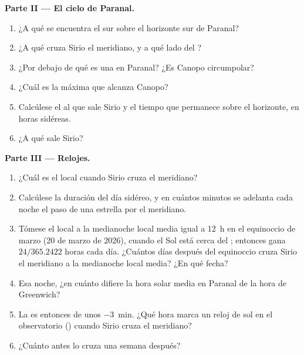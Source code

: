 \begin{problem}
\medskip
\noindent\textbf{Parte II --- El cielo de Paranal.}
\begin{enumerate}[resume]
  \item ¿A qué  se encuentra el  sur sobre el horizonte sur de
        Paranal?
  \item ¿A qué  cruza Sirio el meridiano, y a qué lado del ?
  \item ¿Por debajo de qué  es una  en Paranal?
        ¿Es Canopo circumpolar?
  \item ¿Cuál es la  máxima que alcanza Canopo?
  \item Calcúlese el  al que sale Sirio y el tiempo que permanece
        sobre el horizonte, en horas sidéreas.
  \item ¿A qué  sale Sirio?
\end{enumerate}

\medskip
\noindent\textbf{Parte III --- Relojes.}
\begin{enumerate}[resume]
  \item ¿Cuál es el  local cuando Sirio cruza el meridiano?
  \item Calcúlese la duración del día sidéreo, y en cuántos minutos se adelanta
        cada noche el paso de una estrella por el meridiano.
  \item Tómese el  local a la medianoche local media igual a
        \qty{12}{h} en el equinoccio de marzo (20 de marzo de 2026), cuando el Sol
        está cerca del ; entonces gana $24/365.2422$ horas cada día.
        ¿Cuántos días después del equinoccio cruza Sirio el meridiano a la
        medianoche local media? ¿En qué fecha?
  \item Esa noche, ¿en cuánto difiere la hora solar media en Paranal de la hora
        de Greenwich?
  \item La  es entonces de unos \qty{-3}{min}. ¿Qué hora marca
        un reloj de sol en el observatorio () cuando Sirio
        cruza el meridiano?
  \item ¿Cuánto antes lo cruza una semana después?
\end{enumerate}


\end{problem}
